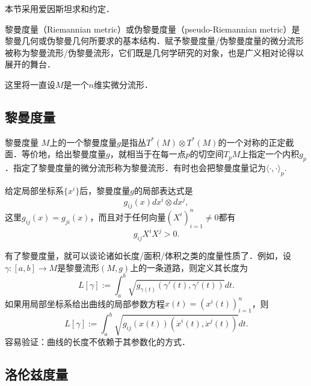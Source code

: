 
本节采用爱因斯坦求和约定．

黎曼度量（Riemannian metric）或伪黎曼度量（pseudo-Riemannian metric）是黎曼几何或伪黎曼几何所要求的基本结构．赋予黎曼度量/伪黎曼度量的微分流形被称为黎曼流形/伪黎曼流形，它们既是几何学研究的对象，也是广义相对论得以展开的舞台．

这里将一直设$M$是一个$n$维实微分流形．

\subsection{黎曼度量}
\begin{definition}{黎曼度量}
$M$上的一个黎曼度量$g$是指丛$T^*(M)\otimes T^*(M)$的一个对称的正定截面．等价地，给出黎曼度量$g$，就相当于在每一点$p$的切空间$T_pM$上指定一个内积$g_p$．指定了黎曼度量的微分流形称为黎曼流形．有时也会把黎曼度量记为$\langle\cdot,\cdot\rangle_p$.
\end{definition}
给定局部坐标系$\{x^i\}$后，黎曼度量$g$的局部表达式是
$$
g_{ij}(x)dx^i\otimes dx^j,
$$
这里$g_{ij}(x)=g_{ji}(x)$，而且对于任何向量$(X^i)_{i=1}^n\neq0$都有
$$
g_{ij}X^iX^j>0.
$$

有了黎曼度量，就可以谈论诸如长度/面积/体积之类的度量性质了．例如，设$\gamma:[a,b]\to M$是黎曼流形$(M,g)$上的一条道路，则定义其长度为
$$
L[\gamma]:=\int_{a}^b \sqrt{g_{\gamma(t)}(\gamma'(t),\gamma'(t))}dt.
$$
如果用局部坐标系给出曲线的局部参数方程$x(t)=(x^i(t))_{i=1}^n$，则
$$
L[\gamma]:=\int_{a}^b \sqrt{g_{ij}(x(t))(\dot x^i(t),\dot x^j(t))}dt.
$$
容易验证：曲线的长度不依赖于其参数化的方式．

\subsection{洛伦兹度量}